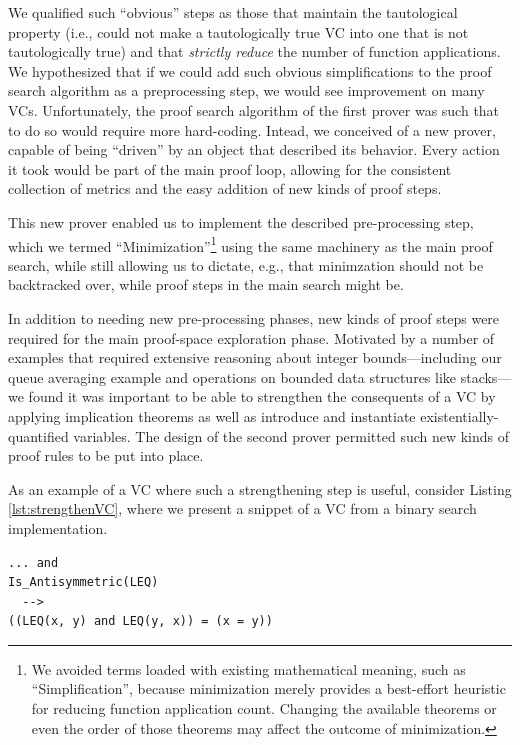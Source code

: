 We qualified such ``obvious'' steps as those that maintain the tautological property (i.e., could not make a tautologically true VC into one that is not tautologically true) and that \emph{strictly reduce} the number of function applications.  We hypothesized that if we could add such obvious simplifications to the proof search algorithm as a preprocessing step, we would see improvement on many VCs.  Unfortunately, the proof search algorithm of the first prover was such that to do so would require more hard-coding.  Intead, we conceived of a new prover, capable of being ``driven'' by an object that described its behavior.  Every action it took would be part of the main proof loop, allowing for the consistent collection of metrics and the easy addition of new kinds of proof steps.

This new prover enabled us to implement the described pre-processing step, which we termed ``Minimization''\footnote{We avoided terms loaded with existing mathematical meaning, such as ``Simplification'', because minimization merely provides a best-effort heuristic for reducing function application count.  Changing the available theorems or even the order of those theorems may affect the outcome of minimization.} using the same machinery as the main proof search, while still allowing us to dictate, e.g., that minimzation should not be backtracked over, while proof steps in the main search might be.

In addition to needing new pre-processing phases, new kinds of proof steps were required for the main proof-space exploration phase.  Motivated by a number of examples that required extensive reasoning about integer bounds---including our queue averaging example and operations on bounded data structures like stacks---we found it was important to be able to strengthen the consequents of a VC by applying implication theorems as well as introduce and instantiate existentially-quantified variables.  The design of the second prover permitted such new kinds of proof rules to be put into place.

As an example of a VC where such a strengthening step is useful, consider Listing \ref{lst:strengthenVC}, where we present a snippet of a VC from a binary search implementation.

\begin{lstlisting}[float=h,language=resolve,caption={A VC for which strenthening the consequent is useful\label{lst:strengthenVC}}]
... and
Is_Antisymmetric(LEQ)
  -->
((LEQ(x, y) and LEQ(y, x)) = (x = y))
\end{lstlisting}

